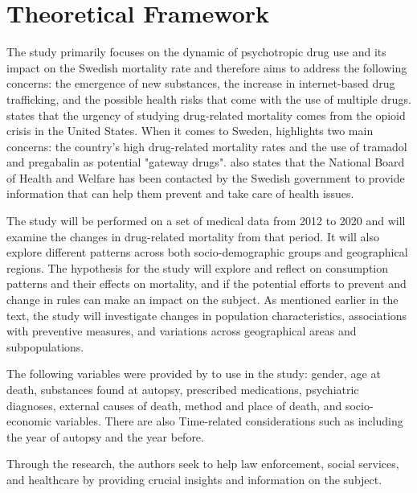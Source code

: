 \section{Theoretical Framework}

The study primarily focuses on the dynamic of psychotropic drug use and its impact on the Swedish mortality rate and therefore aims to address the following concerns: the emergence of new substances, the increase in internet-based drug trafficking, and the possible health risks that come with the use of multiple drugs. \cite{medData} states that the urgency of studying drug-related mortality comes from the opioid crisis in the United States. When it comes to Sweden, \cite{medData} highlights two main concerns: the country's high drug-related mortality rates and the use of tramadol and pregabalin as potential "gateway drugs". \cite{medData} also states that the National Board of Health and Welfare has been contacted by the Swedish government to provide information that can help them prevent and take care of health issues. 


The study will be performed on a set of medical data from 2012 to 2020 and will examine the changes in drug-related mortality from that period. It will also explore different patterns across both socio-demographic groups and geographical regions. The hypothesis for the study will explore and reflect on consumption patterns and their effects on mortality, and if the potential efforts to prevent and change in rules can make an impact on the subject. As mentioned earlier in the text, the study will investigate changes in population characteristics, associations with preventive measures, and variations across geographical areas and subpopulations. 

The following variables were provided by \cite{medData} to use in the study: gender, age at death, substances found at autopsy, prescribed medications, psychiatric diagnoses, external causes of death, method and place of death, and socio-economic variables. There are also Time-related considerations such as including the year of autopsy and the year before. %

Through the research, the authors seek to help law enforcement, social services, and healthcare by providing crucial insights and information on the subject. 
